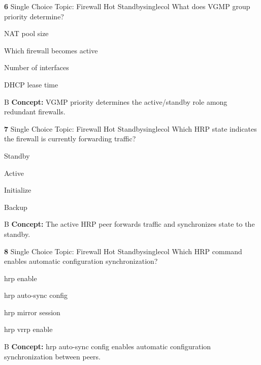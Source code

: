 \documentclass[10pt,a4paper]{article}
\begin{document}
\begin{qcard}{\color{white}\textbf{6} \hfill \small Single Choice \textbar{} Topic: Firewall Hot Standby}{singlecol}
What does VGMP group priority determine?

\begin{qoptions}
\item NAT pool size
\item Which firewall becomes active
\item Number of interfaces
\item DHCP lease time
\end{qoptions}
\begin{explainbox}{B}
\textbf{Concept:} VGMP priority determines the active/standby role among redundant firewalls.
\end{explainbox}
\end{qcard}

\begin{qcard}{\color{white}\textbf{7} \hfill \small Single Choice \textbar{} Topic: Firewall Hot Standby}{singlecol}
Which HRP state indicates the firewall is currently forwarding traffic?

\begin{qoptions}
\item Standby
\item Active
\item Initialize
\item Backup
\end{qoptions}
\begin{explainbox}{B}
\textbf{Concept:} The active HRP peer forwards traffic and synchronizes state to the standby.
\end{explainbox}
\end{qcard}

\begin{qcard}{\color{white}\textbf{8} \hfill \small Single Choice \textbar{} Topic: Firewall Hot Standby}{singlecol}
Which HRP command enables automatic configuration synchronization?

\begin{qoptions}
\item hrp enable
\item hrp auto-sync config
\item hrp mirror session
\item hrp vrrp enable
\end{qoptions}
\begin{explainbox}{B}
\textbf{Concept:} hrp auto-sync config enables automatic configuration synchronization between peers.
\end{explainbox}
\end{qcard}
\end{document}
